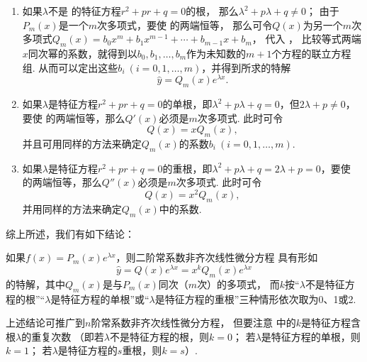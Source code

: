 \begin{enumerate}
\item 如果\(\lambda\)不是  的特征方程\(r^2+pr+q=0\)的根，%
那么\(\lambda^2+p\lambda+q\neq0\)；
由于\(P_m(x)\)是一个\(m\)次多项式，要使  的两端恒等，%
那么可令\(Q(x)\)为另一个\(m\)次多项式\(Q_m(x) = b_0 x^m + b_1 x^{m-1} + \dotsb + b_{m-1} x + b_m\)，%
代入 ，%
比较等式两端\(x\)同次幂的系数，就得到以\(b_0,b_1,\dotsc,b_m\)作为未知数的\(m+1\)个方程的联立方程组.
从而可以定出这些\(b_i\ (i=0,1,\dotsc,m)\)，并得到所求的特解\[
\hat{y} = Q_m(x) e^{\lambda x}.
\]

\item 如果\(\lambda\)是特征方程\(r^2+pr+q=0\)的单根，即\(\lambda^2+p\lambda+q=0\)，但\(2\lambda+p\neq0\)，要使  的两端恒等，那么\(Q'(x)\)必须是\(m\)次多项式.
此时可令\[
Q(x) = x Q_m(x),
\]并且可用同样的方法来确定\(Q_m(x)\)的系数\(b_i\ (i=0,1,\dotsc,m)\).

\item 如果\(\lambda\)是特征方程\(r^2+pr+q=0\)的重根，即\(\lambda^2+p\lambda+q=2\lambda+p=0\)，要使  的两端恒等，那么\(Q''(x)\)必须是\(m\)次多项式.
此时可令\[
Q(x) = x^2 Q_m(x),
\]并用同样的方法来确定\(Q_m(x)\)中的系数.
\end{enumerate}

综上所述，我们有如下结论：

如果\(f(x) = P_m(x) e^{\lambda x}\)，则二阶常系数非齐次线性微分方程  具有形如
\begin{equation}\label{equation:微分方程.二阶常系数齐次线性微分方程.特解1}
\hat{y} = Q(x) e^{\lambda x}
= x^k Q_m(x) e^{\lambda x}
\end{equation}
的特解，其中\(Q_m(x)\)是与\(P_m(x)\)同次（\(m\)次）的多项式，%
而\(k\)按“\(\lambda\)不是特征方程的根”“\(\lambda\)是特征方程的单根”或“\(\lambda\)是特征方程的重根”三种情形依次取为0、1或2.

上述结论可推广到\(n\)阶常系数非齐次线性微分方程，%
但要注意  中的\(k\)是特征方程含根\(\lambda\)的重复次数%
（即若\(\lambda\)不是特征方程的根，则\(k=0\)；
若\(\lambda\)是特征方程的单根，则\(k=1\)；
若\(\lambda\)是特征方程的\(s\)重根，则\(k=s\)）.

